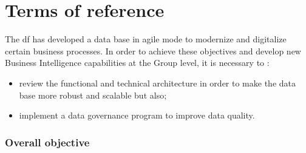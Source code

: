 

\section{Terms of reference}
The \acrlong{df} has developed a data base in agile mode to modernize and digitalize certain business processes. In order to achieve these objectives and develop new Business Intelligence capabilities at the Group level, it is necessary to :
\begin{itemize}[parsep=0cm,itemsep=0cm]
    \item review the functional and technical architecture in order to make the data base more robust and scalable but also;
    \item implement a data governance program to improve data quality.
\end{itemize}
\subsubsection{\textbf{Overall objective }}

